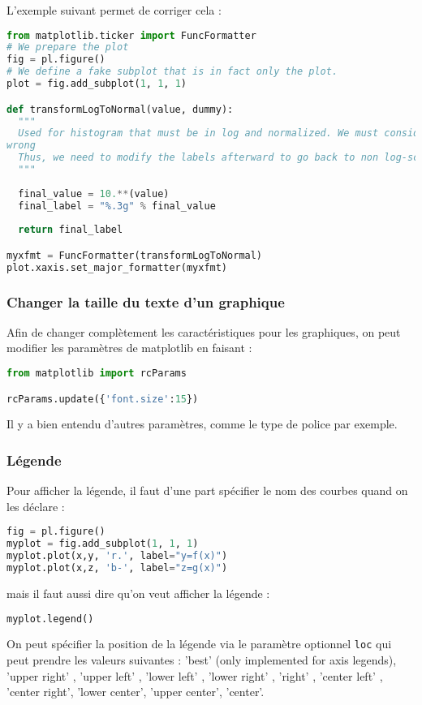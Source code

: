 \documentclass[a4paper,twoside]{article}
\begin{document}
L'exemple suivant permet de corriger cela : 
\begin{lstlisting}[language=python]
from matplotlib.ticker import FuncFormatter
# We prepare the plot
fig = pl.figure()
# We define a fake subplot that is in fact only the plot.
plot = fig.add_subplot(1, 1, 1)

def transformLogToNormal(value, dummy):
  """
  Used for histogram that must be in log and normalized. We must consider directly the log values, but the labels are then
wrong
  Thus, we need to modify the labels afterward to go back to non log-scale values
  """
  
  final_value = 10.**(value)
  final_label = "%.3g" % final_value
  
  return final_label

myxfmt = FuncFormatter(transformLogToNormal)
plot.xaxis.set_major_formatter(myxfmt)
\end{lstlisting}

\subsubsection{Changer la taille du texte d'un graphique}
Afin de changer complètement les caractéristiques pour les graphiques, on peut modifier les paramètres de matplotlib en faisant : 
\begin{lstlisting}[language=python]
from matplotlib import rcParams

rcParams.update({'font.size':15})
\end{lstlisting}

Il y a bien entendu d'autres paramètres, comme le type de police par exemple.

\subsubsection{Légende}
Pour afficher la légende, il faut d'une part spécifier le nom des courbes quand on les déclare : 
\begin{lstlisting}[language=python]
fig = pl.figure()
myplot = fig.add_subplot(1, 1, 1)
myplot.plot(x,y, 'r.', label="y=f(x)")
myplot.plot(x,z, 'b-', label="z=g(x)")
\end{lstlisting}
mais il faut aussi dire qu'on veut afficher la légende :
\begin{lstlisting}[language=python]
myplot.legend()
\end{lstlisting}

\bigskip

On peut spécifier la position de la légende via le paramètre optionnel \texttt{loc} qui peut prendre les valeurs suivantes :
'best' (only implemented for axis legends), 'upper right' , 'upper left' , 'lower left' , 'lower right' , 'right' , 'center left' , 'center right', 'lower center', 'upper center', 'center'.
\end{document}
